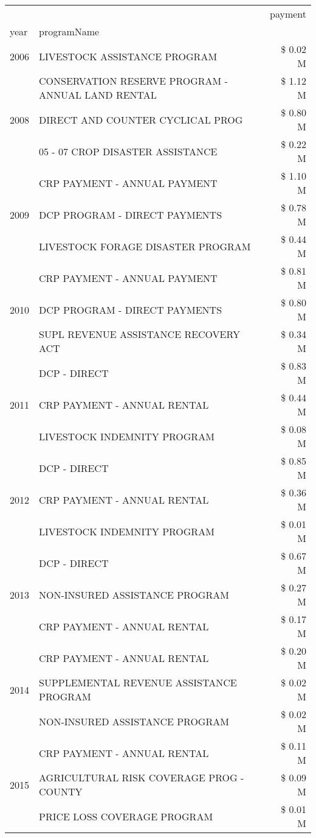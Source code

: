 \begin{tabular}{llr}
\toprule
 &  & payment \\
year & programName &  \\
\midrule
2006 & LIVESTOCK ASSISTANCE PROGRAM & \$ 0.02 M \\
\cline{1-3}
\multirow[t]{3}{*}{2008} & CONSERVATION RESERVE PROGRAM - ANNUAL LAND RENTAL & \$ 1.12 M \\
 & DIRECT AND COUNTER CYCLICAL PROG & \$ 0.80 M \\
 & 05 - 07 CROP DISASTER ASSISTANCE & \$ 0.22 M \\
\cline{1-3}
\multirow[t]{3}{*}{2009} & CRP PAYMENT - ANNUAL PAYMENT & \$ 1.10 M \\
 & DCP PROGRAM - DIRECT PAYMENTS & \$ 0.78 M \\
 & LIVESTOCK FORAGE DISASTER  PROGRAM & \$ 0.44 M \\
\cline{1-3}
\multirow[t]{3}{*}{2010} & CRP PAYMENT - ANNUAL PAYMENT & \$ 0.81 M \\
 & DCP PROGRAM - DIRECT PAYMENTS & \$ 0.80 M \\
 & SUPL REVENUE ASSISTANCE RECOVERY ACT & \$ 0.34 M \\
\cline{1-3}
\multirow[t]{3}{*}{2011} & DCP - DIRECT & \$ 0.83 M \\
 & CRP PAYMENT - ANNUAL RENTAL & \$ 0.44 M \\
 & LIVESTOCK INDEMNITY PROGRAM & \$ 0.08 M \\
\cline{1-3}
\multirow[t]{3}{*}{2012} & DCP - DIRECT & \$ 0.85 M \\
 & CRP PAYMENT - ANNUAL RENTAL & \$ 0.36 M \\
 & LIVESTOCK INDEMNITY PROGRAM & \$ 0.01 M \\
\cline{1-3}
\multirow[t]{3}{*}{2013} & DCP - DIRECT & \$ 0.67 M \\
 & NON-INSURED ASSISTANCE PROGRAM & \$ 0.27 M \\
 & CRP PAYMENT - ANNUAL RENTAL & \$ 0.17 M \\
\cline{1-3}
\multirow[t]{3}{*}{2014} & CRP PAYMENT - ANNUAL RENTAL & \$ 0.20 M \\
 & SUPPLEMENTAL REVENUE ASSISTANCE PROGRAM & \$ 0.02 M \\
 & NON-INSURED ASSISTANCE PROGRAM & \$ 0.02 M \\
\cline{1-3}
\multirow[t]{3}{*}{2015} & CRP PAYMENT - ANNUAL RENTAL & \$ 0.11 M \\
 & AGRICULTURAL RISK COVERAGE PROG - COUNTY & \$ 0.09 M \\
 & PRICE LOSS COVERAGE PROGRAM & \$ 0.01 M \\

\end{tabular}
